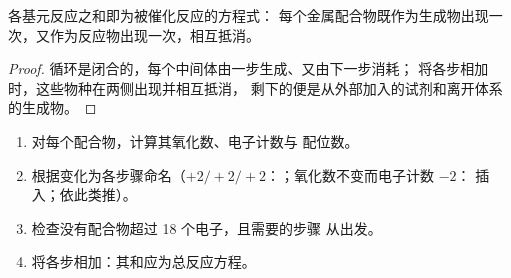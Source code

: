 \begin{proposition}[总反应方程]\label{prop:b2:catalytic-cycles:cycle-sum}
各基元反应之和即为被催化反应的方程式：
每个金属配合物既作为生成物出现一次，又作为反应物出现一次，相互抵消。
\end{proposition}

\begin{proof}
循环是闭合的，每个中间体由一步生成、又由下一步消耗；
将各步相加时，这些物种在两侧出现并相互抵消，
剩下的便是从外部加入的试剂和离开体系的生成物。
\end{proof}

\begin{method}[读懂催化循环]\label{met:b2:catalytic-cycles:read-cycle}
\begin{enumerate}
  \item 对每个配合物，计算其氧化数、电子计数与
        配位数。
  \item 根据变化为各步骤命名（$+2/+2/+2$：；氧化数不变而电子计数 $-2$：
        插入；依此类推）。
  \item 检查没有配合物超过 18 个电子，且需要的步骤
        从出发。
  \item 将各步相加：其和应为总反应方程。
\end{enumerate}
\end{method}

